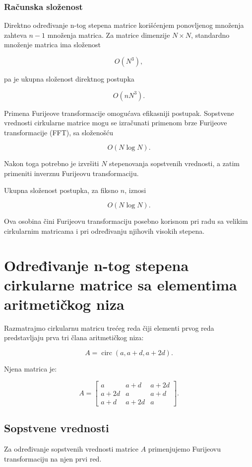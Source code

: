 \documentclass[12pt,a4paper]{report}
\begin{document}
\subsection{Računska složenost}

Direktno određivanje n-tog stepena matrice korišćenjem ponovljenog množenja zahteva \(n-1\) množenja matrica. Za matrice dimenzije \(N\times N\), standardno množenje matrica ima složenost

\[
O(N^3),
\]

pa je ukupna složenost direktnog postupka

\[
O(nN^3).
\]

Primena Furijeove transformacije omogućava efikasniji postupak. Sopstvene vrednosti cirkularne matrice mogu se izračunati primenom brze Furijeove transformacije (FFT), sa složenošću

\[
O(N\log N).
\]

Nakon toga potrebno je izvršiti \(N\) stepenovanja sopstvenih vrednosti, a zatim primeniti inverznu Furijeovu transformaciju.

Ukupna složenost postupka, za fiksno \(n\), iznosi

\[
\boxed{O(N\log N)}.
\]

Ova osobina čini Furijeovu transformaciju posebno korisnom pri radu sa velikim cirkularnim matricama i pri određivanju njihovih visokih stepena.

\chapter{Određivanje n-tog stepena cirkularne matrice sa elementima aritmetičkog niza}

Razmatrajmo cirkularnu matricu trećeg reda čiji elementi prvog reda predstavljaju prva tri člana aritmetičkog niza:

\[
A=\operatorname{circ}(a,a+d,a+2d).
\]

Njena matrica je:

\[
A=
\begin{bmatrix}
	a & a+d & a+2d\\
	a+2d & a & a+d\\
	a+d & a+2d & a
\end{bmatrix}.
\]

\section{Sopstvene vrednosti}

Za određivanje sopstvenih vrednosti matrice \(A\) primenjujemo Furijeovu transformaciju na njen prvi red.
\end{document}
